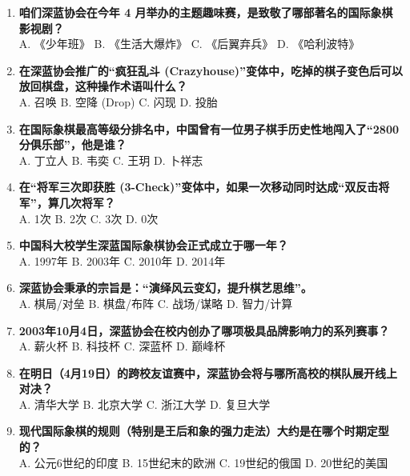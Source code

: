 \documentclass[a4paper, 11pt]{ctexart}
\begin{document}
\begin{enumerate}[label=\arabic*., itemsep=1.5em]
    \item \textbf{咱们深蓝协会在今年 4 月举办的主题趣味赛，是致敬了哪部著名的国际象棋影视剧？} \\
    A. 《少年班》 \qquad B. 《生活大爆炸》 \qquad C. 《后翼弃兵》 \qquad D. 《哈利波特》

    \item \textbf{在深蓝协会推广的“疯狂乱斗 (Crazyhouse)”变体中，吃掉的棋子变色后可以放回棋盘，这种操作术语叫什么？} \\
    A. 召唤 \qquad B. 空降 (Drop) \qquad C. 闪现 \qquad D. 投胎

    \item \textbf{在国际象棋最高等级分排名中，中国曾有一位男子棋手历史性地闯入了“2800分俱乐部”，他是谁？} \\
    A. 丁立人 \qquad B. 韦奕 \qquad C. 王玥 \qquad D. 卜祥志

    \item \textbf{在“将军三次即获胜 (3-Check)”变体中，如果一次移动同时达成“双反击将军”，算几次将军？} \\
    A. 1次 \qquad B. 2次 \qquad C. 3次 \qquad D. 0次

\item \textbf{中国科大校学生深蓝国际象棋协会正式成立于哪一年？} \\
    A. 1997年 \qquad B. 2003年 \qquad C. 2010年 \qquad D. 2014年

    \item \textbf{深蓝协会秉承的宗旨是：“\uline{\hspace{3em}}演绎风云变幻，\uline{\hspace{3em}}提升棋艺思维”。} \\
    A. 棋局/对垒 \qquad B. 棋盘/布阵 \qquad C. 战场/谋略 \qquad D. 智力/计算

    \item \textbf{2003年10月4日，深蓝协会在校内创办了哪项极具品牌影响力的系列赛事？} \\
    A. 薪火杯 \qquad B. 科技杯 \qquad C. 深蓝杯 \qquad D. 巅峰杯

    \item \textbf{在明日（4月19日）的跨校友谊赛中，深蓝协会将与哪所高校的棋队展开线上对决？} \\
    A. 清华大学 \qquad B. 北京大学 \qquad C. 浙江大学 \qquad D. 复旦大学

    \item \textbf{现代国际象棋的规则（特别是王后和象的强力走法）大约是在哪个时期定型的？} \\
    A. 公元6世纪的印度 \quad B. 15世纪末的欧洲 \quad C. 19世纪的俄国 \quad D. 20世纪的美国


\end{enumerate}
\end{document}
